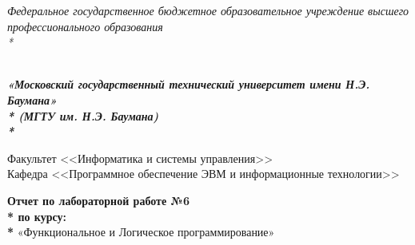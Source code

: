 \newpage
\begin{titlepage}
\thispagestyle{empty}

{\large
\begin{center}
	\textsl{Федеральное государственное бюджетное образовательное учреждение высшего профессионального образования \\* }	
	\vspace{2em}
\end{center}
}
{
\begin{minipage}[t]{0.13\textwidth}
  \centering{}
  \label{fig0}
  \end{minipage}\hfill
\begin{minipage}[t]{0.65\textwidth}
\begin{center}
\large  \textsl{\textbf {\\ «Московский государственный технический университет имени Н.Э. Баумана» \\* (МГТУ им. Н.Э. Баумана) \\* }}
  \end{center}
\end{minipage}
}

\vspace{2em}

\hrulefill

\begin{center}
 	\vspace{0pt plus2fill} %
	{\large
	Факультет  <<Информатика и системы управления>>\\
	Кафедра  <<Программное обеспечение ЭВМ и информационные технологии>>
	}
\end{center}

{\Large
\begin{center}
	\textbf{Отчет по лабораторной работе №6\\* по курсу: \\* } «Функциональное и Логическое программирование» \\
\end{center}
}
%
\vspace{0pt plus4fill} %


\end{titlepage}
